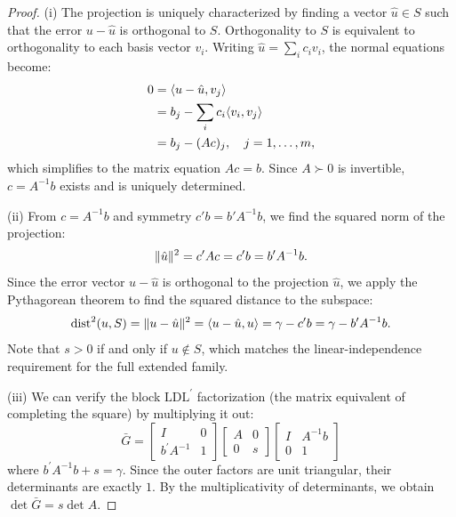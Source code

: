 \documentclass{IEEEtran}
\begin{document}
\begin{proof}
  (i) The projection is uniquely characterized by finding a vector $\hat{u} \in S$ such that the error $u - \hat{u}$ is orthogonal to $S$. Orthogonality to $S$ is equivalent to orthogonality to each basis vector $v_{i}$. Writing $\hat{u} = \sum_{i} c_{i} v_{i}$, the normal equations become:
  \begin{equation*}
    \begin{aligned}
      0 &= \langle u - \hat{u}, v_{j}\rangle \\
      &= b_{j} - \sum_{i} c_{i}\langle v_{i}, v_{j}\rangle  \\
      &= b_{j} - (A c)_{j},
      \quad j = 1, \ldots, m,
    \end{aligned}
  \end{equation*}
  which simplifies to the matrix equation $Ac = b$. Since $A \succ 0$ is invertible, $c = A^{-1} b$ exists and is uniquely determined.

  (ii) From $c = A^{-1}b$ and symmetry $c'b = b'A^{-1}b$, we find the squared norm of the projection:
  \begin{equation*}
    \lVert\hat{u}\rVert^{2} = c^{\prime} A c = c^{\prime} b = b^{\prime} A^{-1} b .
  \end{equation*}
  Since the error vector $u - \hat{u}$ is orthogonal to the projection $\hat{u}$, we apply the Pythagorean theorem to find the squared distance to the subspace:
  \begin{equation*}
    \operatorname{dist}^{2}(u,S) = \lVert u - \hat{u}\rVert^{2}
    = \langle u - \hat{u}, u\rangle
    = \gamma - c^{\prime} b
    = \gamma - b^{\prime} A^{-1} b .
  \end{equation*}
  Note that $s > 0$ if and only if $u \notin S$, which matches the linear-independence requirement for the full extended family.

  (iii) We can verify the block $\mathrm{LDL}^{\prime}$ factorization (the matrix equivalent of completing the square) by multiplying it out:
  \begin{equation*}
    \bar{G} =
    \begin{bmatrix}
      I & 0 \\
      b^{\prime} A^{-1} & 1
    \end{bmatrix}
    \begin{bmatrix}
      A & 0 \\
      0 & s
    \end{bmatrix}
    \begin{bmatrix}
      I & A^{-1} b \\
      0 & 1
    \end{bmatrix}
  \end{equation*}
  where $b^{\prime} A^{-1} b + s = \gamma$. Since the outer factors are unit triangular, their determinants are exactly $1$. By the multiplicativity of determinants, we obtain $\det \bar{G} = s \det A$.
\end{proof}
\end{document}
